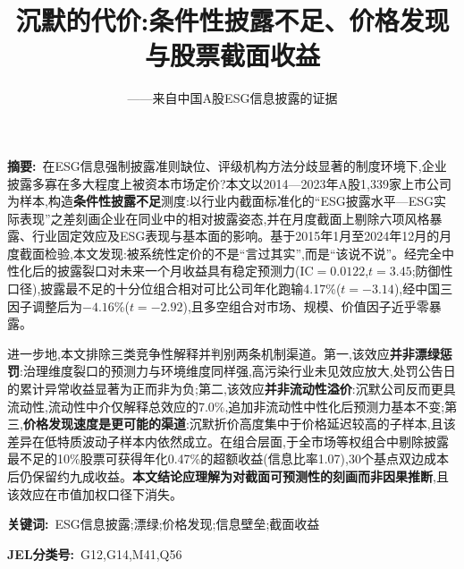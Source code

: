\documentclass[UTF8, a4paper, fontset=fandol, zihao=-4]{ctexart}
\title{\zihao{3}\textbf{沉默的代价:条件性披露不足、价格发现\\与股票截面收益}}
\author{\zihao{-4} ——来自中国A股ESG信息披露的证据}
\date{}
\begin{document}
\maketitle
\thispagestyle{empty}

\begin{center}
\begin{minipage}{0.92\textwidth}
\noindent\textbf{摘\quad 要:}~在ESG信息强制披露准则缺位、评级机构方法分歧显著的制度环境下,企业披露多寡在多大程度上被资本市场定价?本文以2014—2023年A股1{,}339家上市公司为样本,构造\textbf{条件性披露不足}测度:以行业内截面标准化的“ESG披露水平—ESG实际表现”之差刻画企业在同业中的相对披露姿态,并在月度截面上剔除六项风格暴露、行业固定效应及ESG表现与基本面的影响。基于2015年1月至2024年12月的月度截面检验,本文发现:被系统性定价的不是“言过其实”,而是“该说不说”。经完全中性化后的披露裂口对未来一个月收益具有稳定预测力(IC${}=0.0122$,$t=3.45$;防御性口径),披露最不足的十分位组合相对可比公司年化跑输4.17\%($t=-3.14$),经中国三因子调整后为$-4.16$\%($t=-2.92$),且多空组合对市场、规模、价值因子近乎零暴露。

进一步地,本文排除三类竞争性解释并判别两条机制渠道。第一,该效应\textbf{并非漂绿惩罚}:治理维度裂口的预测力与环境维度同样强,高污染行业未见效应放大,处罚公告日的累计异常收益显著为正而非为负;第二,该效应\textbf{并非流动性溢价}:沉默公司反而更具流动性,流动性中介仅解释总效应的7.0\%,追加非流动性中性化后预测力基本不变;第三,\textbf{价格发现速度是更可能的渠道}:沉默折价高度集中于价格延迟较高的子样本,且该差异在低特质波动子样本内依然成立。在组合层面,于全市场等权组合中剔除披露最不足的10\%股票可获得年化0.47\%的超额收益(信息比率1.07),30个基点双边成本后仍保留约九成收益。\textbf{本文结论应理解为对截面可预测性的刻画而非因果推断},且该效应在市值加权口径下消失。

\vspace{4pt}
\noindent\textbf{关键词:}~ESG信息披露;漂绿;价格发现;信息壁垒;截面收益

\noindent\textbf{JEL分类号:}~G12,G14,M41,Q56
\end{minipage}
\end{center}
\end{document}
